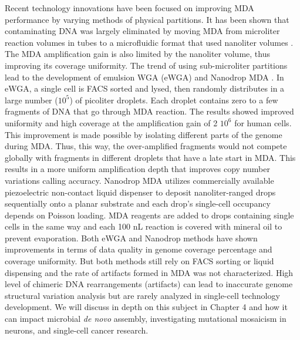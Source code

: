 Recent technology innovations have been focused on improving MDA performance by varying methods of physical partitions. It has been shown that contaminating DNA was largely eliminated by moving MDA from microliter reaction volumes in tubes to a microfluidic format that used nanoliter volumes \cite{deBourcy:2014ji}. The MDA amplification gain is also limited by the nanoliter volume, thus improving its coverage uniformity. The trend of using sub-microliter partitions lead to the development of emulsion WGA (eWGA) \cite{Fu:2015gl} and Nanodrop MDA \cite{Leung:2016vx}. In eWGA, a single cell is FACS sorted and lysed, then randomly distributes in a large number ($10^5$) of picoliter droplets. Each droplet contains zero to a few fragments of DNA that go through MDA reaction. The results showed improved uniformity and high coverage at the amplification gain of 2 \times $10^6$ for human cells. This improvement is made possible by isolating different parts of the genome during MDA. Thus, this way, the over-amplified fragments would not compete globally with fragments in different droplets that have a late start in MDA. This results in a more uniform amplification depth that improves copy number variations calling accuracy. Nanodrop MDA utilizes commercially available piezoelectric non-contact liquid dispenser to deposit nanoliter-ranged drops sequentially onto a planar substrate and each drop's single-cell occupancy depends on Poisson loading. MDA reagents are added to drops containing single cells in the same way and each 100 nL reaction is covered with mineral oil to prevent evaporation. Both eWGA and Nanodrop methods have shown improvements in terms of data quality in genome coverage percentage and coverage uniformity. But both methods still rely on FACS sorting or liquid dispensing and the rate of artifacts formed in MDA was not characterized. High level of chimeric DNA rearrangements (artifacts) can lead to inaccurate genome structural variation analysis but are rarely analyzed in single-cell technology development. We will discuss in depth on this subject in Chapter 4 and how it can impact microbial \textit{de novo} assembly, investigating mutational mosaicism in neurons, and single-cell cancer research. 


